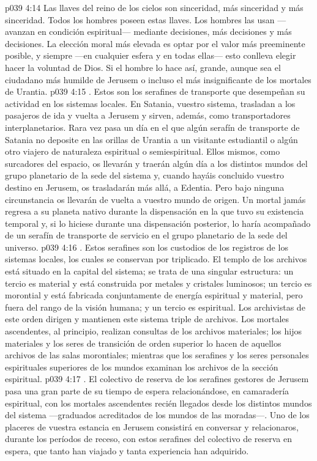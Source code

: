 \vs p039 4:14 Las llaves del reino de los cielos son sinceridad, más sinceridad y más sinceridad. Todos los hombres poseen estas llaves. Los hombres las usan ---avanzan en condición espiritual--- mediante decisiones, más decisiones y más decisiones. La elección moral más elevada es optar por el valor más preeminente posible, y siempre ---en cualquier esfera y en todas ellas--- esto conlleva elegir hacer la voluntad de Dios. Si el hombre lo hace así,  grande, aunque sea el ciudadano más humilde de Jerusem o incluso el más insignificante de los mortales de Urantia.
\vs p039 4:15 . Estos son los serafines de transporte que desempeñan su actividad en los sistemas locales. En Satania, vuestro sistema, trasladan a los pasajeros de ida y vuelta a Jerusem y sirven, además, como transportadores interplanetarios. Rara vez pasa un día en el que algún serafín de transporte de Satania no deposite en las orillas de Urantia a un visitante estudiantil o algún otro viajero de naturaleza espiritual o semiespiritual. Ellos mismos, como surcadores del espacio, os llevarán y traerán algún día a los distintos mundos del grupo planetario de la sede del sistema y, cuando hayáis concluido vuestro destino en Jerusem, os trasladarán más allá, a Edentia. Pero bajo ninguna circunstancia os llevarán de vuelta a vuestro mundo de origen. Un mortal jamás regresa a su planeta nativo durante la dispensación en la que tuvo su existencia temporal y, si lo hiciese durante una dispensación posterior, lo haría acompañado de un serafín de transporte de servicio en el grupo planetario de la sede del universo.
\vs p039 4:16 . Estos serafines son los custodios de los registros de los sistemas locales, los cuales se conservan por triplicado. El templo de los archivos está situado en la capital del sistema; se trata de una singular estructura: un tercio es material y está construida por metales y cristales luminosos; un tercio es morontial y está fabricada conjuntamente de energía espiritual y material, pero fuera del rango de la visión humana; y un tercio es espiritual. Los archivistas de este orden dirigen y mantienen este sistema triple de archivos. Los mortales ascendentes, al principio, realizan consultas de los archivos materiales; los hijos materiales y los seres de transición de orden superior lo hacen de aquellos archivos de las salas morontiales; mientras que los serafines y los seres personales espirituales superiores de los mundos examinan los archivos de la sección espiritual.
\vs p039 4:17 . El colectivo de reserva de los serafines gestores de Jerusem pasa una gran parte de su tiempo de espera relacionándose, en camaradería espiritual, con los mortales ascendentes recién llegados desde los distintos mundos del sistema ---graduados acreditados de los mundos de las moradas---. Uno de los placeres de vuestra estancia en Jerusem consistirá en conversar y relacionaros, durante los períodos de receso, con estos serafines del colectivo de reserva en espera, que tanto han viajado y tanta experiencia han adquirido.
